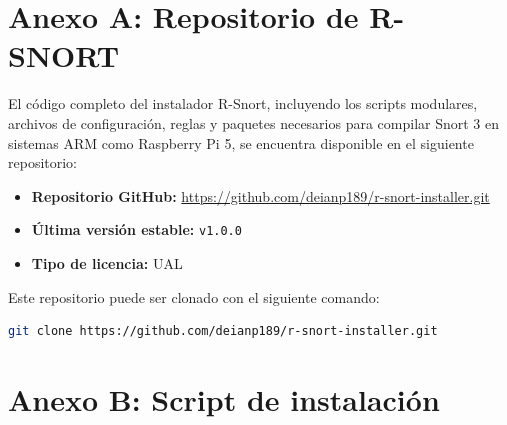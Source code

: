 \documentclass[11pt,a4paper,twoside]{report}
\begin{document}
\appendix
\chapter{Anexo A: Repositorio de R-SNORT}
\label{anexo_repositorio}

El código completo del instalador R-Snort, incluyendo los scripts modulares, archivos de configuración, reglas y paquetes necesarios para compilar Snort 3 en sistemas ARM como Raspberry Pi 5, se encuentra disponible en el siguiente repositorio:

\begin{itemize}
	\item \textbf{Repositorio GitHub:} \url{https://github.com/deianp189/r-snort-installer.git}
	\item \textbf{Última versión estable:} \texttt{v1.0.0}
	\item \textbf{Tipo de licencia:} UAL
\end{itemize}

Este repositorio puede ser clonado con el siguiente comando:

\begin{lstlisting}[language=bash]
	git clone https://github.com/deianp189/r-snort-installer.git
\end{lstlisting}

\chapter{Anexo B: Script de instalación}
\end{document}
